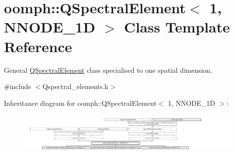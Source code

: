 \hypertarget{classoomph_1_1QSpectralElement_3_011_00_01NNODE__1D_01_4}{}\section{oomph\+:\+:Q\+Spectral\+Element$<$ 1, N\+N\+O\+D\+E\+\_\+1D $>$ Class Template Reference}
\label{classoomph_1_1QSpectralElement_3_011_00_01NNODE__1D_01_4}


General \hyperlink{classoomph_1_1QSpectralElement}{Q\+Spectral\+Element} class specialised to one spatial dimension.  




{\ttfamily \#include $<$Qspectral\+\_\+elements.\+h$>$}

Inheritance diagram for oomph\+:\+:Q\+Spectral\+Element$<$ 1, N\+N\+O\+D\+E\+\_\+1D $>$\+:\begin{figure}[H]
\begin{center}
\leavevmode
\includegraphics[height=2.037422cm]{classoomph_1_1QSpectralElement_3_011_00_01NNODE__1D_01_4}
\end{center}
\end{figure}
